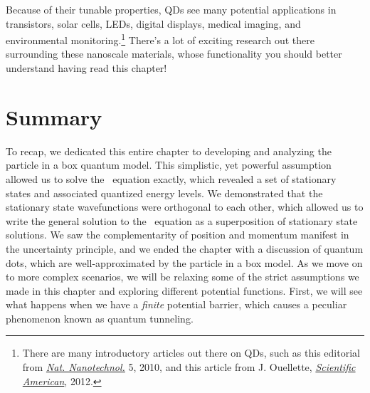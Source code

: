 Because of their tunable properties, QDs see many potential applications in transistors, solar cells, LEDs, digital displays, medical imaging, and environmental monitoring.\footnote{There are many introductory articles out there on QDs, such as this editorial from \href{http://www.nature.com/nnano/journal/v5/n6/full/nnano.2010.127.html}{\emph{Nat. Nanotechnol.}} 5, 2010, and this article from J. Ouellette, \href{https://blogs.scientificamerican.com/cocktail-party-physics/quantum-dots-of-many-colors/}{\emph{Scientific American}}, 2012.} 
There's a lot of exciting research out there surrounding these nanoscale materials, whose functionality you should better understand having read this chapter!


\section{Summary}

To recap, we dedicated this entire chapter to developing and analyzing the particle in a box quantum model. 
This simplistic, yet powerful assumption allowed us to solve the \Sch\ equation exactly, which revealed a set of stationary states and associated quantized energy levels. 
We demonstrated that the stationary state wavefunctions were orthogonal to each other, which allowed us to write the general solution to the \Sch\ equation as a superposition of stationary state solutions. 
We saw the complementarity of position and momentum manifest in the uncertainty principle, and we ended the chapter with a discussion of quantum dots, which are well-approximated by the particle in a box model. 
As we move on to more complex scenarios, we will be relaxing some of the strict assumptions we made in this chapter and exploring different potential functions. 
First, we will see what happens when we have a \emph{finite} potential barrier, which causes a peculiar phenomenon known as quantum tunneling.

%